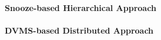 \paragraph{Snooze-based Hierarchical Approach}
\label{subsec:snooze}


\paragraph{DVMS-based Distributed Approach}
\label{subsec:dvms}




